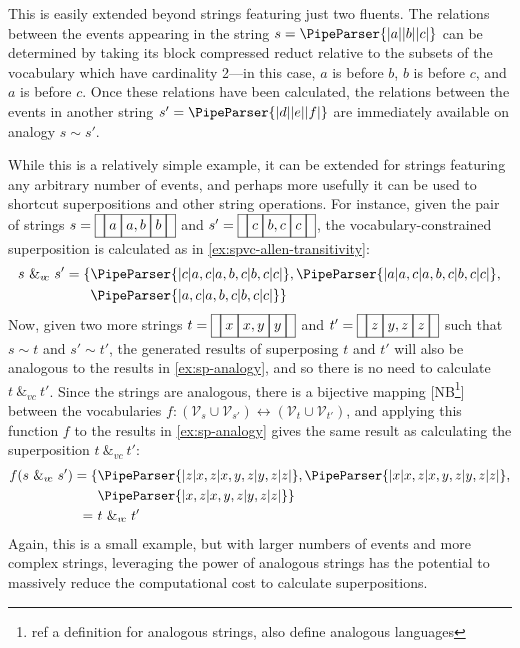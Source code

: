 \documentclass[a4paper,12pt,leqno]{article}
\newcommand{\vph}[1]{\vphantom{#1}}
\newcommand{\ebox}[1]{\fbox{$\vph{'(),}#1$}}
\newcommand{\nbOverlaps}[2]{\ebox{#1}\ebox{#1,#2}\ebox{#2}}
\newcommand{\nbDuring}[2]{\ebox{#2}\ebox{#1,#2}\ebox{#2}}
\newcommand{\Overlaps}[2]{\ebox{}\nbOverlaps{#1}{#2}\ebox{}}
\newcommand{\During}[2]{\ebox{}\nbDuring{#1}{#2}\ebox{}}
\newcommand{\spvc}{~\&_{v\!c}~}
\newcommand{\V}{\mathcal{V}}
\newcommand{\EventString}[1]{%
	\renewcommand*{\do}[1]{\ebox{##1}}%
	\PipeParser{#1}%
}
\newcommand{\selfnote}[1]{{\color{red}[NB\footnote{{\color{red}#1}}]}}
\newcommand{\nb}{\selfnote}
\begin{document}
This is easily extended beyond strings featuring just two fluents. The relations between the events appearing in the string $s = \EventString{{}|a|{}|b|{}|c|{}}$ can be determined by taking its block compressed reduct relative to the subsets of the vocabulary which have cardinality 2---in this case, $a$ is before $b$, $b$ is before $c$, and $a$ is before $c$. Once these relations have been calculated, the relations between the events in another string $s' = \EventString{{}|d|{}|e|{}|f|{}}$ are immediately available on analogy $s \sim s'$.

While this is a relatively simple example, it can be extended for strings featuring any arbitrary number of events, and perhaps more usefully it can be used to shortcut superpositions and other string operations. For instance, given the pair of strings $s = \Overlaps{a}{b}$ and $s' = \During{b}{c}$, the vocabulary-constrained superposition is calculated as in \cref{ex:spvc-allen-transitivity}:
\begin{align}\label{ex:sp-analogy}
	s \spvc s' = \{&\EventString{{}|c|a,c|a,b,c|b,c|c|{}}, \EventString{{}|a|a,c|a,b,c|b,c|c|{}},\\
	&\EventString{{}|a,c|a,b,c|b,c|c|{}}\}\notag
\end{align}
Now, given two more strings $t = \Overlaps{x}{y}$ and $t' = \During{y}{z}$ such that $s \sim t$ and $s' \sim t'$, the generated results of superposing $t$ and $t'$ will also be analogous to the results in \cref{ex:sp-analogy}, and so there is no need to calculate $t \spvc t'$. Since the strings are analogous, there is a bijective mapping \nb{ref a definition for analogous strings, also define analogous languages} between the vocabularies $f: (\V_{s} \cup \V_{s'}) \leftrightarrow (\V_{t} \cup \V_{t'})$, and applying this function $f$ to the results in \cref{ex:sp-analogy} gives the same result as calculating the superposition $t \spvc t'$:
\begin{align}\label{ex:sp-analogy-equal}
	f(s \spvc s') = \{&\EventString{{}|z|x,z|x,y,z|y,z|z|{}}, \EventString{{}|x|x,z|x,y,z|y,z|z|{}},\\
	&\EventString{{}|x,z|x,y,z|y,z|z|{}}\}\notag\\
	=~&t \spvc t'
\end{align}
Again, this is a small example, but with larger numbers of events and more complex strings, leveraging the power of analogous strings has the potential to massively reduce the computational cost to calculate superpositions.

\end{document}
